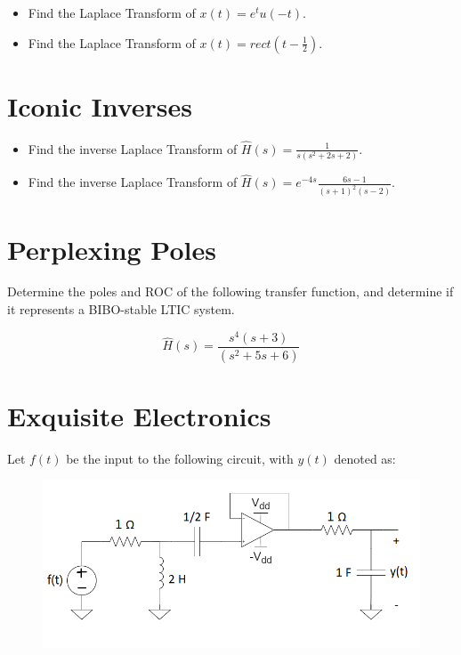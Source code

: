 \documentclass{article}
\begin{document}
\begin{itemize}
    \item Find the Laplace Transform of $x(t) = e^t u(-t)$.
    \item Find the Laplace Transform of $x(t) = rect(t - \frac{1}{2})$.
\end{itemize}

\vfill

\section{Iconic Inverses}

\begin{itemize}
    \item Find the inverse Laplace Transform of $\hat{H}(s) = \frac{1}{s(s^2 + 2s + 2)}$.
    \item Find the inverse Laplace Transform of $\hat{H}(s) = e^{-4s}\frac{6s-1}{(s+1)^2(s-2)}$.
\end{itemize}

\vfill

\newpage
\section{Perplexing Poles}

Determine the poles and ROC of the following transfer function, and determine if it represents a BIBO-stable LTIC system.

$$\hat{H}(s) = \frac{s^4(s + 3)}{(s^2 + 5s + 6)}$$

\vspace{4cm}

\section{Exquisite Electronics}

Let $f(t)$ be the input to the following circuit, with $y(t)$ denoted as:

\begin{figure}[h]
\begin{center}
    \includegraphics[width=0.5 
    \textwidth]{figures/circuit7.png}
\end{center}
\end{figure}
\end{document}
